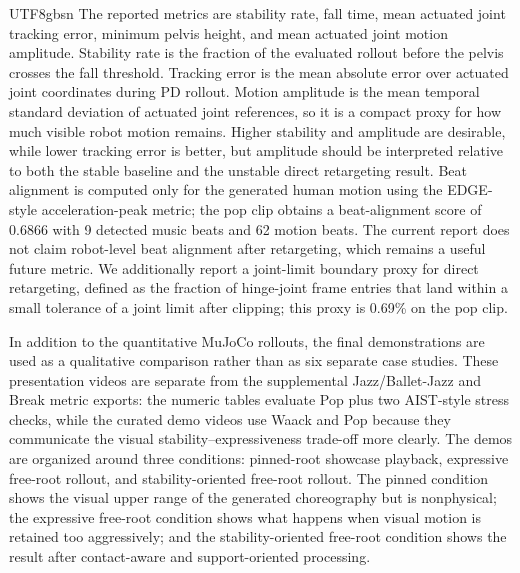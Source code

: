 \documentclass[conference]{IEEEtran}
\begin{document}
\begin{CJK*}{UTF8}{gbsn}
The reported metrics are stability rate, fall time, mean actuated joint tracking error, minimum pelvis height, and mean actuated joint motion amplitude. Stability rate is the fraction of the evaluated rollout before the pelvis crosses the fall threshold. Tracking error is the mean absolute error over actuated joint coordinates during PD rollout. Motion amplitude is the mean temporal standard deviation of actuated joint references, so it is a compact proxy for how much visible robot motion remains. Higher stability and amplitude are desirable, while lower tracking error is better, but amplitude should be interpreted relative to both the stable baseline and the unstable direct retargeting result. Beat alignment is computed only for the generated human motion using the EDGE-style acceleration-peak metric; the pop clip obtains a beat-alignment score of 0.6866 with 9 detected music beats and 62 motion beats. The current report does not claim robot-level beat alignment after retargeting, which remains a useful future metric. We additionally report a joint-limit boundary proxy for direct retargeting, defined as the fraction of hinge-joint frame entries that land within a small tolerance of a joint limit after clipping; this proxy is 0.69\% on the pop clip.

In addition to the quantitative MuJoCo rollouts, the final demonstrations are used as a qualitative comparison rather than as six separate case studies. These presentation videos are separate from the supplemental Jazz/Ballet-Jazz and Break metric exports: the numeric tables evaluate Pop plus two AIST-style stress checks, while the curated demo videos use Waack and Pop because they communicate the visual stability--expressiveness trade-off more clearly. The demos are organized around three conditions: pinned-root showcase playback, expressive free-root rollout, and stability-oriented free-root rollout. The pinned condition shows the visual upper range of the generated choreography but is nonphysical; the expressive free-root condition shows what happens when visual motion is retained too aggressively; and the stability-oriented free-root condition shows the result after contact-aware and support-oriented processing.


\end{CJK*}
\end{document}

